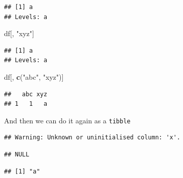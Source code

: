 \documentclass[]{book}
\newenvironment{Shaded}{\begin{snugshade}}{\end{snugshade}}
\newcommand{\KeywordTok}[1]{\textcolor[rgb]{0.13,0.29,0.53}{\textbf{{#1}}}}
\newcommand{\DataTypeTok}[1]{\textcolor[rgb]{0.13,0.29,0.53}{{#1}}}
\newcommand{\DecValTok}[1]{\textcolor[rgb]{0.00,0.00,0.81}{{#1}}}
\newcommand{\StringTok}[1]{\textcolor[rgb]{0.31,0.60,0.02}{{#1}}}
\newcommand{\NormalTok}[1]{{#1}}
\theoremstyle{definition}
\theoremstyle{definition}
\theoremstyle{remark}
\begin{document}
\begin{enumerate}
\begin{verbatim}
## [1] a
## Levels: a
\end{verbatim}

\begin{Shaded}
\begin{Highlighting}[]
\NormalTok{df[, }\StringTok{"xyz"}\NormalTok{]}
\end{Highlighting}
\end{Shaded}

\begin{verbatim}
## [1] a
## Levels: a
\end{verbatim}

\begin{Shaded}
\begin{Highlighting}[]
\NormalTok{df[, }\KeywordTok{c}\NormalTok{(}\StringTok{"abc"}\NormalTok{, }\StringTok{"xyz"}\NormalTok{)]}
\end{Highlighting}
\end{Shaded}

\begin{verbatim}
##   abc xyz
## 1   1   a
\end{verbatim}

  And then we can do it again as a \texttt{tibble}

\begin{Shaded}
\end{Shaded}

\begin{verbatim}
## Warning: Unknown or uninitialised column: 'x'.
\end{verbatim}

\begin{verbatim}
## NULL
\end{verbatim}

\begin{Shaded}
\end{Shaded}

\begin{verbatim}
## [1] "a"
\end{verbatim}


\end{enumerate}
\end{document}
